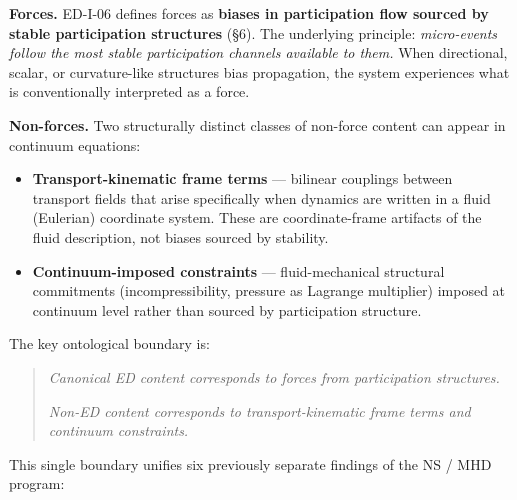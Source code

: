 \documentclass[
  11pt,a4paper]{article}
\providecommand{\tightlist}{%
  \setlength{\itemsep}{0pt}\setlength{\parskip}{0pt}}
\begin{document}
\textbf{Forces.} ED-I-06 defines forces as \textbf{biases in
participation flow sourced by stable participation structures} (§6). The
underlying principle: \emph{micro-events follow the most stable
participation channels available to them.} When directional, scalar, or
curvature-like structures bias propagation, the system experiences what
is conventionally interpreted as a force.

\textbf{Non-forces.} Two structurally distinct classes of non-force
content can appear in continuum equations:

\begin{itemize}
\tightlist
\item
  \textbf{Transport-kinematic frame terms} --- bilinear couplings
  between transport fields that arise specifically when dynamics are
  written in a fluid (Eulerian) coordinate system. These are
  coordinate-frame artifacts of the fluid description, not biases
  sourced by stability.
\item
  \textbf{Continuum-imposed constraints} --- fluid-mechanical structural
  commitments (incompressibility, pressure as Lagrange multiplier)
  imposed at continuum level rather than sourced by participation
  structure.
\end{itemize}

The key ontological boundary is:

\begin{quote}
\emph{Canonical ED content corresponds to forces from participation
structures.}

\emph{Non-ED content corresponds to transport-kinematic frame terms and
continuum constraints.}
\end{quote}

This single boundary unifies six previously separate findings of the NS
/ MHD program:
\end{document}
